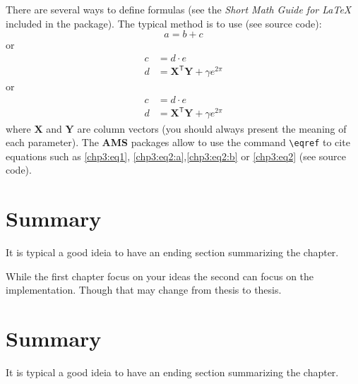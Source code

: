 \documentclass[defaultstyle,10pt,master,Helvetica]{thesis}
\begin{document}
There are several ways to define formulas (see the \textit{Short Math Guide for LaTeX} included in the package). The typical method is to use (see source code): 
\begin{equation}
a= b + c
\end{equation}
or
\begin{align}
c &= d \cdot e \nonumber\\
d &= \mathbf{X}^{\mathsf{T}} \mathbf{Y}+ \gamma e^{2\pi}
\label{chp3:eq1} 
\end{align}
or
\begin{subequations}
\begin{align}
c &= d \cdot e \label{chp3:eq2:a} \\
d &= \mathbf{X}^{\mathsf{T}} \mathbf{Y} + \gamma e^{2\pi}
\label{chp3:eq2:b} 
\end{align}
\label{chp3:eq2} 
\end{subequations}
where $\mathbf{X}$ and $\mathbf{Y}$ are column vectors (you should always present the meaning of each parameter). The \textbf{AMS} packages allow to use the command \verb"\eqref" to cite equations such as \eqref{chp3:eq1},  \eqref{chp3:eq2:a},\eqref{chp3:eq2:b} or \eqref{chp3:eq2} (see source code).

\section{Summary}

It is typical a good ideia to have an ending section summarizing the chapter.

\cleardoublepage

While the first chapter focus on your ideas the second can focus on the implementation. Though that may change from thesis to thesis.



\section{Summary}

It is typical a good ideia to have an ending section summarizing the chapter.

\cleardoublepage

\end{document}
